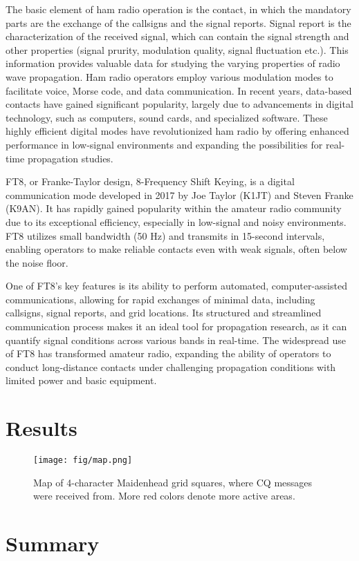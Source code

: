 \documentclass[conference]{IEEEtran}
\begin{document}
The basic element of ham radio operation is the contact, in which the mandatory
parts are the exchange of the callsigns and the signal reports. Signal report
is the characterization of the received signal, which can contain the signal strength
and other properties (signal prurity, modulation quality, signal fluctuation etc.).
This information provides valuable data for studying the varying properties of radio
wave propagation.
Ham radio operators employ various modulation modes to facilitate voice, Morse
code, and data communication. In recent years, data-based contacts have gained
significant popularity, largely due to advancements in digital technology, such
as computers, sound cards, and specialized software. These highly efficient
digital modes have revolutionized ham radio by offering enhanced performance in
low-signal environments and expanding the possibilities for real-time
propagation studies.

FT8, or Franke-Taylor design, 8-Frequency Shift Keying, is a digital
communication mode developed in 2017 by Joe Taylor (K1JT) and Steven Franke
(K9AN). It has rapidly gained popularity within the amateur radio community due
to its exceptional efficiency, especially in low-signal and noisy environments.
FT8 utilizes small bandwidth (50 Hz) and transmits in 15-second intervals,
enabling operators to make reliable contacts even with weak signals, often
below the noise floor.

One of FT8's key features is its ability to perform automated,
computer-assisted communications, allowing for rapid exchanges of minimal data,
including callsigns, signal reports, and grid locations. Its structured and
streamlined communication process makes it an ideal tool for propagation
research, as it can quantify signal conditions across various bands in
real-time. The widespread use of FT8 has transformed amateur radio, expanding
the ability of operators to conduct long-distance contacts under challenging
propagation conditions with limited power and basic equipment.

\cite{ga-vrp}

\section{Results}

\begin{figure}[htbp]
	\centering
	\texttt{[image: fig/map.png]}
	\caption{Map of 4-character Maidenhead grid squares, where CQ messages were received from.
  More red colors denote more active areas.}
	\label{fig-dummy}
\end{figure}

\section{Summary}




\end{document}
